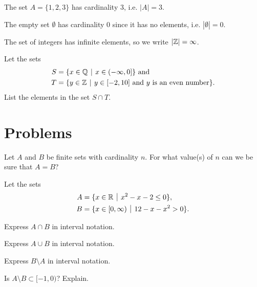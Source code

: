 \begin{example}
    The set $A = \{1, 2, 3\}$ has cardinality 3, i.e. $|A| = 3$.
\end{example}

\begin{example}
    The empty set $\emptyset$ has cardinality 0 since it has no elements, i.e. $|\emptyset| = 0$.
\end{example}

\begin{example}
    The set of integers has infinite elements, so we write $|\mathbb{Z}| = \infty$.
\end{example}

\begin{exercise}
    Let the sets
    \begin{align*}
        S &= \{x \in \Q \vert x \in (-\infty, 0]\} \text{ and}\\
        T &= \{y \in \Z \vert y \in [-2, 10] \text{ and } y \text{ is an even number} \}.
    \end{align*}
    List the elements in the set $S \cap T$.
\end{exercise}

\newpage

\section{Problems}
\begin{problem}
    Let $A$ and $B$ be finite sets with cardinality $n$. For what value(s) of $n$ can we be sure that $A = B$?
\end{problem}

\begin{problem}
    Let the sets
    \begin{align*}
        A &= \{x \in \R \vert x^2 - x - 2 \leq 0\},\\
        B &= \{x \in [0, \infty) \vert 12 - x - x^2 > 0\}.
    \end{align*}
    \begin{partquestions}{\alph*}
        \item Express $A \cap B$ in interval notation.
        \item Express $A \cup B$ in interval notation.
        \item Express $B \setminus A$ in interval notation.
        \item Is $A \setminus B \subset [-1, 0)$? Explain.
    \end{partquestions}
\end{problem}

